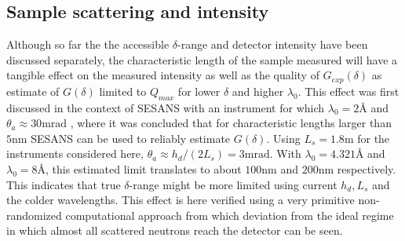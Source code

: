 \documentclass{article}
\begin{document}
\subsection{Sample scattering and intensity}
\label{c4.4}
Although so far the the accessible $\delta$-range and detector intensity have been discussed separately, the characteristic length of the sample measured will have a tangible effect on the measured intensity as well as the quality of $G_{exp}(\delta)$ as estimate of $G(\delta)$ limited to $Q_{max}$ for lower $\delta$ and higher $\lambda_0$. This effect was first discussed in the context of SESANS with an instrument for which $\lambda_0 = 2$Å and $\theta_a \approx 30\unit{\milli\radian}$ \cite{rekveldt1996}, where it was concluded that for characteristic lengths larger than $5\unit{\nano\meter}$ SESANS can be used to reliably estimate $G(\delta)$. Using $L_s = 1.8\unit\meter$ for the instruments considered here, $\theta_a \approx h_d / (2L_s) = 3\unit{\milli\radian}$. With $\lambda_0 = 4.321$Å and $\lambda_0 = 8$Å, this estimated limit translates to about $100 \unit{\nano\meter}$ and $200 \unit{\nano\meter}$ respectively. This indicates that true $\delta$-range might be more limited using current $h_d,L_s$ and the colder wavelengths. This effect is here verified using a very primitive non-randomized computational approach from which deviation from the ideal regime in which almost all scattered neutrons reach the detector \cite{rekveldt1996} can be seen. 
\end{document}
